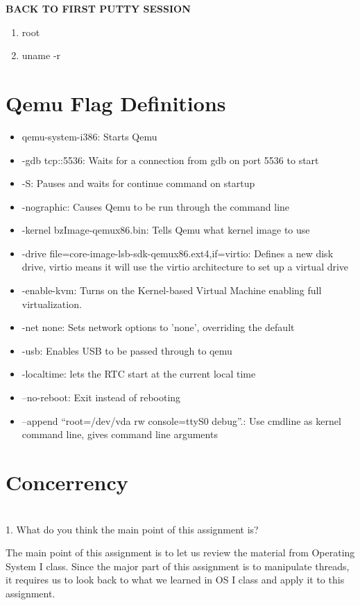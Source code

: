 \documentclass[letterpaper,10pt]{article}
\begin{document}
\textbf{BACK TO FIRST PUTTY SESSION}
\begin{enumerate}
\item root
\item uname -r
\end{enumerate}

\newpage

\section*{Qemu Flag Definitions}

\begin{itemize}
\item qemu-system-i386: Starts Qemu
\item -gdb tcp::5536: Waits for a connection from gdb on port 5536 to start
\item -S: Pauses and waits for continue command on startup
\item -nographic: Causes Qemu to be run through the command line
\item -kernel bzImage-qemux86.bin: Tells Qemu what kernel image to use
\item -drive file=core-image-lsb-sdk-qemux86.ext4,if=virtio: Defines a new disk drive, virtio means it will use the virtio architecture to set up a virtual drive
\item -enable-kvm: Turns on the Kernel-based Virtual Machine enabling full virtualization.
\item -net none: Sets network options to ’none’, overriding the default
\item -usb: Enables USB to be passed through to qemu
\item -localtime: lets the RTC start at the current local time
\item –no-reboot: Exit instead of rebooting
\item –append “root=/dev/vda rw console=ttyS0 debug”.: Use cmdline as kernel command line, gives command line arguments
\end{itemize}
\newpage

\section*{Concerrency} \\

1.	What do you think the main point of this assignment is?

The main point of this assignment is to let us review the material from Operating System I class. Since the major part of this assignment is to manipulate threads, it requires us to look back to what we learned in OS I class and apply it to this assignment.\\
\end{document}
